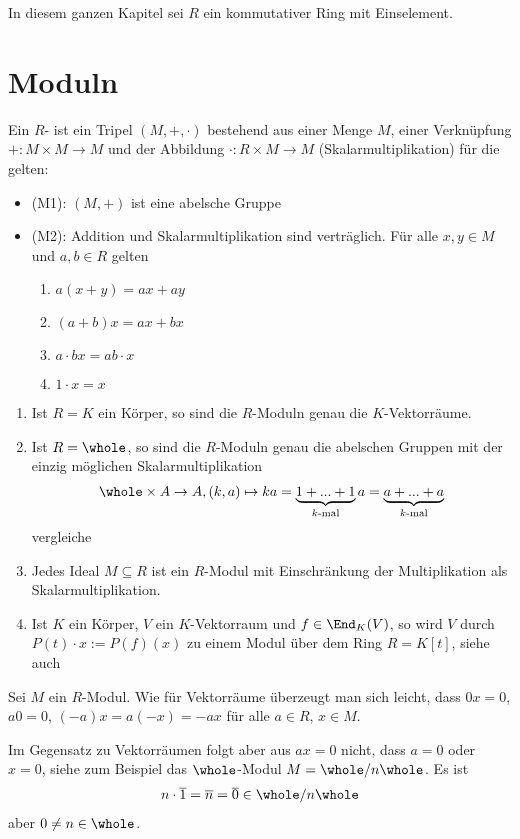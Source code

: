 In diesem ganzen Kapitel sei $R$ ein kommutativer Ring mit Einselement.

\section{Moduln}

\begin{definition}
	Ein $R$- ist ein Tripel $(M,+,\cdot)$ bestehend aus einer Menge $M$, einer Verknüpfung $+:M\times M\to M$ und der Abbildung $\cdot:R\times M\to M$ (Skalarmultiplikation) für die gelten:
	\begin{itemize}
		\item (M1): $(M,+)$ ist eine abelsche Gruppe
		\item (M2): Addition und Skalarmultiplikation sind verträglich. Für alle $x,y\in M$ und $a,b\in R$ gelten
		\begin{enumerate}
			\item $a(x+y)=ax+ay$
			\item $(a+b)x=ax+bx$
			\item $a\cdot bx=ab\cdot x$
			\item $1\cdot x=x$
		\end{enumerate}
	\end{itemize}
\end{definition}

\begin{example}
	\begin{enumerate}
		\item Ist $R=K$ ein Körper, so sind die $R$-Moduln genau die $K$-Vektorräume.
		\item Ist $R=\whole$, so sind die $R$-Moduln genau die abelschen Gruppen mit der einzig möglichen Skalarmultiplikation 
		\begin{align}
			\whole\times A\to A,(k,a)\mapsto ka=\underbrace{1+...+1}_{k\text{-mal}}a=\underbrace{a+...+a}_{k\text{-mal}}\notag
		\end{align}
		vergleiche 
		\item Jedes Ideal $M\subseteq R$ ist ein $R$-Modul mit Einschränkung der Multiplikation als Skalarmultiplikation.
		\item Ist $K$ ein Körper, $V$ ein $K$-Vektorraum und $f\in\End_K(V)$, so wird $V$ durch $P(t)\cdot x:=P(f)(x)$ zu einem Modul über dem Ring $R=K[t]$, siehe auch 
	\end{enumerate}
\end{example}

\begin{remark}
	Sei $M$ ein $R$-Modul. Wie für Vektorräume überzeugt man sich leicht, dass $0x=0$, $a0=0$, $(-a)x=a(-x)=-ax$ für alle $a\in R$, $x\in M$. 
	
	Im Gegensatz zu Vektorräumen folgt aber aus $ax=0$ nicht, dass $a=0$ oder $x=0$, siehe zum Beispiel das $\whole$-Modul $M=\whole/n\whole$. Es ist
	\begin{align}
		n\cdot\overline{1}=\overline{n}=\overline{0}\in\whole/n\whole\notag
	\end{align}
	aber $0\neq n\in\whole$.
\end{remark}

